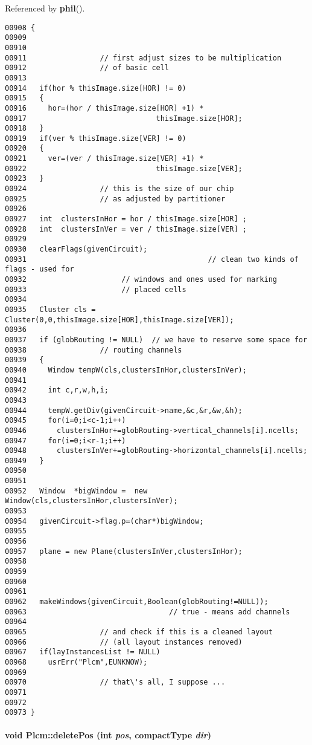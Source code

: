 Referenced by {\bf phil}().\small\begin{verbatim}00908 {
00909 
00910 
00911                 // first adjust sizes to be multiplication
00912                 // of basic cell
00913 
00914   if(hor % thisImage.size[HOR] != 0)
00915   {
00916     hor=(hor / thisImage.size[HOR] +1) *
00917                              thisImage.size[HOR];
00918   }
00919   if(ver % thisImage.size[VER] != 0)
00920   {
00921     ver=(ver / thisImage.size[VER] +1) *
00922                              thisImage.size[VER];
00923   }
00924                 // this is the size of our chip
00925                 // as adjusted by partitioner
00926 
00927   int  clustersInHor = hor / thisImage.size[HOR] ;
00928   int  clustersInVer = ver / thisImage.size[VER] ;
00929 
00930   clearFlags(givenCircuit);
00931                                          // clean two kinds of flags - used for
00932                      // windows and ones used for marking 
00933                      // placed cells
00934 
00935   Cluster cls = Cluster(0,0,thisImage.size[HOR],thisImage.size[VER]);
00936 
00937   if (globRouting != NULL)  // we have to reserve some space for 
00938                 // routing channels
00939   {
00940     Window tempW(cls,clustersInHor,clustersInVer);
00941 
00942     int c,r,w,h,i;
00943     
00944     tempW.getDiv(givenCircuit->name,&c,&r,&w,&h);
00945     for(i=0;i<c-1;i++)
00946       clustersInHor+=globRouting->vertical_channels[i].ncells;
00947     for(i=0;i<r-1;i++)
00948       clustersInVer+=globRouting->horizontal_channels[i].ncells;
00949   }
00950 
00951 
00952   Window  *bigWindow =  new Window(cls,clustersInHor,clustersInVer);
00953 
00954   givenCircuit->flag.p=(char*)bigWindow; 
00955 
00956 
00957   plane = new Plane(clustersInVer,clustersInHor);
00958 
00959 
00960 
00961 
00962   makeWindows(givenCircuit,Boolean(globRouting!=NULL)); 
00963                                 // true - means add channels
00964 
00965                 // and check if this is a cleaned layout
00966                 // (all layout instances removed)
00967   if(layInstancesList != NULL)
00968     usrErr("Plcm",EUNKNOW);
00969 
00970                 // that\'s all, I suppose ...
00971 
00972    
00973 }
\end{verbatim}\normalsize 
\label{Plcm_c19}
\paragraph{\setlength{\rightskip}{0pt plus 5cm}void Plcm::delete\-Pos (int {\em pos}, {\bf compact\-Type} {\em dir})\hspace{0.3cm}{\tt  [private]}}\hfill



